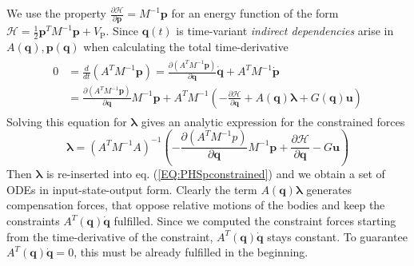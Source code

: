 \documentclass[a4paper,twoside, openright,12pt]{report}
\newcommand{\f}[1]{\boldsymbol{#1}}
\newcommand{\g}[1]{\text{#1}}
\begin{document}
{\begin{equation}
\end{equation}
We use the property $\frac{\partial \mathcal{H}}{\partial \f{p}}=M^{-1}\f{p}$ for an energy function of the form $\mathcal{H} = \frac{1}{2}\f{p}^TM^{-1}\f{p} + V_\g{P}$. Since $\f{q}(t)$ is time-variant \emph{indirect dependencies} arise in $A(\f{q}),\f{p}(\f{q})$ when calculating the total time-derivative
\begin{eqnarray}
\begin{aligned}
0 &= \frac{d}{dt}(A^TM^{-1}\f{p}) = \frac{\partial (A^TM^{-1}\f{p})}{\partial \f{q}}\dot{\f{q}} + A^TM^{-1}\dot{\f{p}}  \\
 &= \frac{\partial (A^TM^{-1}\f{p})}{\partial \f{q}}M^{-1}\f{p} + A^TM^{-1}\left(-\frac{\partial \mathcal{H}}{\partial \f{q}}+A(\f{q})\boldsymbol{\lambda} +G(\f{q})\f{u}\right)
\end{aligned}
\end{eqnarray}
Solving this equation for $\boldsymbol{\lambda}$ gives an analytic expression for the constrained forces
\begin{equation}
\boldsymbol{\lambda} = (A^T M^{-1} A)^{-1} \left(-\frac{\partial (A^TM^{-1}p)}{\partial \f{q}}M^{-1}\f{p} + \frac{\partial \mathcal{H}}{\partial \f{q}} - G\f{u}\right)
\end{equation}
Then $\boldsymbol{\lambda}$ is re-inserted into eq. (\ref{EQ:PHSpconstrained}) and we obtain a set of ODEs in input-state-output form. Clearly the term $A(\f{q})\boldsymbol{\lambda}$ generates compensation forces, that oppose relative motions of the bodies and keep the constraints $A^T(\f{q})\dot{\f{q}}$ fulfilled. Since we computed the constraint forces starting from the time-derivative of the constraint, $A^T(\f{q})\dot{\f{q}}$ stays constant. To guarantee $A^T(\f{q})\dot{\f{q}}=0$, this must be already fulfilled in the beginning.
}
\end{document}

